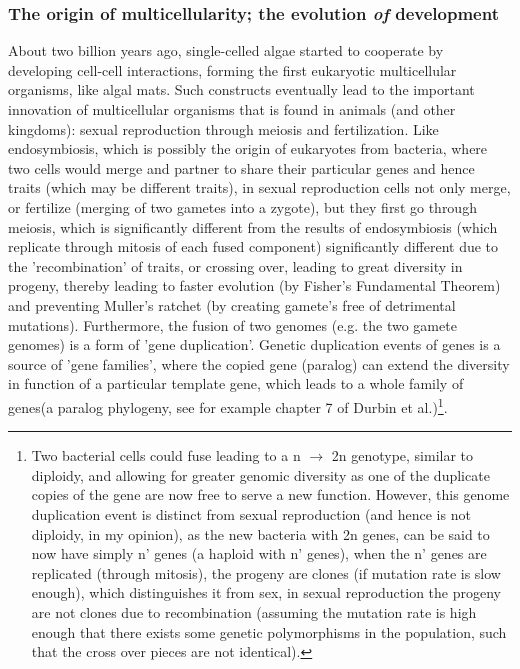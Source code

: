 \subsubsection{The origin of multicellularity; the evolution \textit{of} development}
About two billion years ago, single-celled algae started to cooperate by developing cell-cell interactions, forming the first eukaryotic multicellular  organisms, like algal mats.  Such constructs eventually lead to the important innovation of multicellular organisms that is found in animals (and other kingdoms): sexual reproduction through meiosis and fertilization.  Like endosymbiosis, which is possibly the origin of eukaryotes from bacteria, where two cells would merge and partner to share their particular genes and hence traits (which may be different traits), in sexual reproduction cells not only merge, or fertilize (merging of two gametes into a zygote), but they first go through meiosis, which is significantly different from the results of endosymbiosis (which replicate through mitosis of each fused component) significantly different due to the 'recombination' of traits, or crossing over, leading to great diversity in progeny, thereby leading to faster evolution (by Fisher's Fundamental Theorem) and preventing Muller's ratchet (by creating gamete's free of detrimental mutations).  Furthermore, the fusion of two genomes (e.g. the two gamete genomes) is a form of 'gene duplication'.  Genetic duplication events of genes is a source of 'gene families', where the copied gene (paralog) can extend the diversity in function of a particular template gene, which leads to a whole family of genes(a paralog phylogeny, see for example chapter 7 of Durbin et al.\cite{BSA})\footnote{Two bacterial cells could fuse leading to a n $\rightarrow$ 2n genotype, similar to diploidy, and allowing for greater genomic diversity as one of the duplicate copies of the gene are now free to serve a new function.  However, this genome duplication event is distinct from sexual reproduction (and hence is not diploidy, in my opinion), as the new bacteria with 2n genes, can be said to now have simply n' genes (a haploid with n' genes), when the n' genes are replicated (through mitosis), the progeny are clones (if mutation rate is slow enough), which distinguishes it from sex, in sexual reproduction the progeny are not clones due to recombination (assuming the mutation rate is high enough that there exists some genetic polymorphisms in the population, such that the cross over pieces are not identical).}.  

